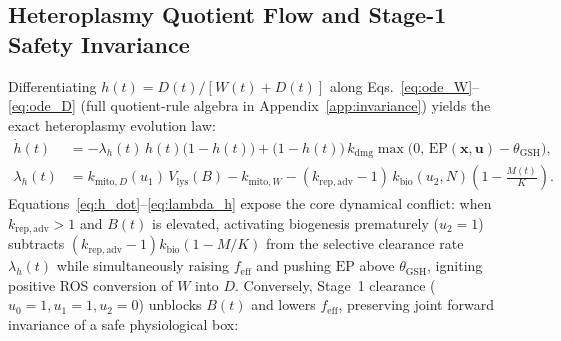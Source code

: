 \documentclass[11pt]{article}
\theoremstyle{plain}
\theoremstyle{remark}
\begin{document}
\subsection{Heteroplasmy Quotient Flow and Stage-1 Safety Invariance}
Differentiating $h(t) = D(t)/[W(t)+D(t)]$ along Eqs.~\eqref{eq:ode_W}--\eqref{eq:ode_D} (full quotient-rule algebra in Appendix~\ref{app:invariance}) yields the exact heteroplasmy evolution law:
\begin{align}
  \dot{h}(t) &= -\lambda_h(t)\,h(t)\big(1 - h(t)\big) + \big(1 - h(t)\big)\,k_{\mathrm{dmg}}\max\!\big(0,\, \mathrm{EP}(\mathbf{x}, \mathbf{u}) - \theta_{\mathrm{GSH}}\big), \label{eq:h_dot} \\
  \lambda_h(t) &= k_{\mathrm{mito},D}(u_1)\,V_{\mathrm{lys}}(B) - k_{\mathrm{mito},W} - (k_{\mathrm{rep,adv}} - 1)\,k_{\mathrm{bio}}(u_2, N)\!\left(1 - \frac{M(t)}{K}\right). \label{eq:lambda_h}
\end{align}
Equations~\eqref{eq:h_dot}--\eqref{eq:lambda_h} expose the core dynamical conflict: when $k_{\mathrm{rep,adv}} > 1$ and $B(t)$ is elevated, activating biogenesis prematurely ($u_2 = 1$) subtracts $(k_{\mathrm{rep,adv}} - 1)k_{\mathrm{bio}}(1 - M/K)$ from the selective clearance rate $\lambda_h(t)$ while simultaneously raising $f_{\mathrm{eff}}$ and pushing $\mathrm{EP}$ above $\theta_{\mathrm{GSH}}$, igniting positive ROS conversion of $W$ into $D$. Conversely, Stage~1 clearance ($u_0 = 1, u_1 = 1, u_2 = 0$) unblocks $B(t)$ and lowers $f_{\mathrm{eff}}$, preserving joint forward invariance of a safe physiological box:
\end{document}
